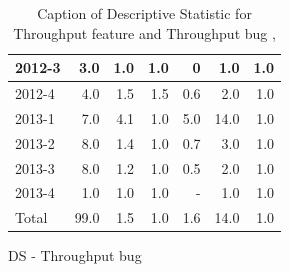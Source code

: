 \documentclass[UKenglish]{ifimaster}  %
\begin{document}
\begin{appendices}
\begin{table}[!htbp]
\begin{adjustwidth}{-2.5cm}{}
\begin{subfigure}[b]{0.3\textwidth}
{\begin{tabular}{ | l | r | r | r | r | r | r | }
2012-3 & 3.0 & 1.0 & 1.0 & 0 & 1.0 & 1.0\\ \hline
2012-4 & 4.0 & 1.5 & 1.5 & 0.6 & 2.0 & 1.0\\ \hline
2013-1 & 7.0 & 4.1 & 1.0 & 5.0 & 14.0 & 1.0\\ \hline
2013-2 & 8.0 & 1.4 & 1.0 & 0.7 & 3.0 & 1.0\\ \hline
2013-3 & 8.0 & 1.2 & 1.0 & 0.5 & 2.0 & 1.0\\ \hline
2013-4 & 1.0 & 1.0 & 1.0 & - & 1.0 & 1.0\\ \hline
Total & 99.0 & 1.5 & 1.0 & 1.6 & 14.0 & 1.0\\ \hline
\end{tabular}
}
\caption{DS - Throughput bug}
 \label{DS:TPB:8}
\end{subfigure}
\end{adjustwidth}
\caption[Optional caption for list of figures]{Caption of Descriptive Statistic for Throughput feature and Throughput bug  , }
\label{DS:8:2}
\end{table}




\end{appendices}
\end{document}

